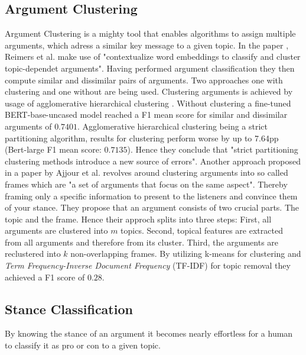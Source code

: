     \subsection{Argument Clustering}
        Argument Clustering is a mighty tool that enables algorithms to assign multiple arguments, which adress a similar
        key message to a given topic. In the paper \cite{reimers2019classification}, Reimers et al. make use of 
        "contextualize word embeddings to classify and cluster topic-dependet arguments". Having performed argument
        classification they then compute similar and dissimilar pairs of arguments. Two approaches one with clustering
        and one without are being used. 
        Clustering arguments is achieved by usage of agglomerative hierarchical clustering \cite{day1984efficient}. 
        Without clustering a fine-tuned BERT-base-uncased model reached a F1 mean score for similar and dissimilar
        arguments of $0.7401$. 
        Agglomerative hierarchical clustering being a strict partitioning algorithm, results for clustering perform
        worse by up to 7.64pp (Bert-large F1 mean score: $0.7135$). Hence they conclude that "strict partitioning 
        clustering methods introduce a new source of errors".
        Another approach proposed in a paper \cite{ajjour2019modeling} by Ajjour et al. revolves around clustering 
        arguments into so called frames which are "a set of arguments that focus on the same aspect". 
        Thereby framing \cite{entman1993framing} only a specific information to present to the listeners and convince 
        them of your stance.
        They propose that an argument consists of two crucial parts. The topic and the frame.
        Hence their approch splits into three steps: First, all arguments are clustered into $m$ topics. Second,
        topical features are extracted from all arguments and therefore from its cluster. Third, the arguments are 
        reclustered into $k$ non-overlapping frames. By utilizing k-means \cite{hartigan1979ak} for clustering
        and \textit{Term Frequency-Inverse Document Frequency} (TF-IDF) for topic removal they achieved a F1 score of 
        $0.28$.


    \subsection{Stance Classification}
        By knowing the stance of an argument it becomes nearly effortless for a human to classify it as pro or con 
        to a given topic. 
